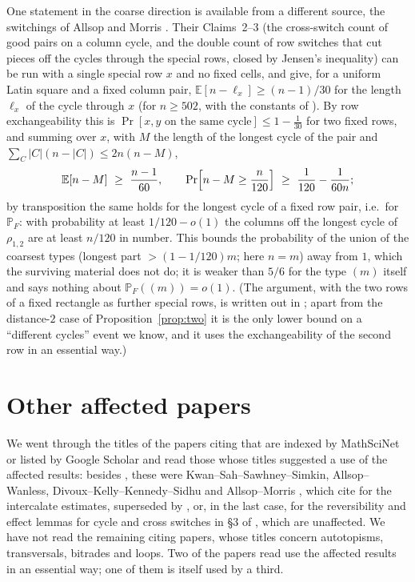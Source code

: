 \documentclass[11pt]{article}
\theoremstyle{remark}
\newcommand{\PP}{\mathbb P}
\newcommand{\E}{\mathbb E}
\begin{document}
One statement in the coarse direction is available from a different
source, the switchings of Allsop and Morris \cite{AM26}.  Their
Claims~2--3 (the cross-switch count of good pairs on a column cycle,
and the double count of row switches that cut pieces off the cycles
through the special rows, closed by Jensen's inequality) can be run
with a single special row $x$ and no fixed cells, and give, for a
uniform Latin square and a fixed column pair, $\E[n-\ell_x]\ge(n-1)/30$
for the length $\ell_x$ of the cycle through $x$ (for $n\ge502$, with
the constants of \cite[\S7]{paper}).  By row exchangeability this is
$\Pr[x,y\text{ on the same cycle}]\le1-\tfrac1{30}$ for two fixed rows,
and summing over $x$, with $M$ the length of the longest cycle of the
pair and $\sum_C|C|(n-|C|)\le2n(n-M)$,
\[
\E[n-M]\ \ge\ \frac{n-1}{60},\qquad
\Pr\Bigl[n-M\ge\frac n{120}\Bigr]\ \ge\ \frac1{120}-\frac1{60n};
\]
by transposition the same holds for the longest cycle of a fixed row
pair, i.e.\ for $\PP_F$: with probability at least $1/120-o(1)$ the
columns off the longest cycle of $\rho_{1,2}$ are at least $n/120$ in
number.  This bounds the probability of the union of the coarsest
types (longest part $>(1-1/120)m$; here $n=m$) away from $1$, which the
surviving material does not do; it is weaker than $5/6$ for the type
$(m)$ itself and says nothing about $\PP_F((m))=o(1)$.  (The
argument, with the two rows of a fixed rectangle as further special
rows, is written out in \cite[\S8]{paper}; apart from the distance-$2$ case of
Proposition~\ref{prop:two} it is the only lower bound on a ``different
cycles'' event we know, and it uses the exchangeability of the second
row in an essential way.)

\section{Other affected papers}
\label{sec:other}

We went through the
titles of the papers citing \cite{CGW08} that are indexed by MathSciNet
or listed by Google Scholar and read those whose titles suggested a
use of the affected results: besides \cite{GMW25,CW16,KPS25}, these were
Kwan--Sah--Sawhney--Simkin, Allsop--Wanless, Divoux--Kelly--Kennedy--Sidhu
and Allsop--Morris \cite{AM26}, which cite \cite{CGW08} for the
intercalate estimates, superseded by \cite{KS18}, or, in the last case,
for the reversibility and effect lemmas for cycle and cross switches in
\S3 of \cite{CGW08}, which are unaffected.  We have not read the
remaining citing papers, whose titles concern autotopisms, transversals,
bitrades and loops.  Two of the papers read use the affected results in
an essential way; one of them is itself used by a third.
\end{document}
